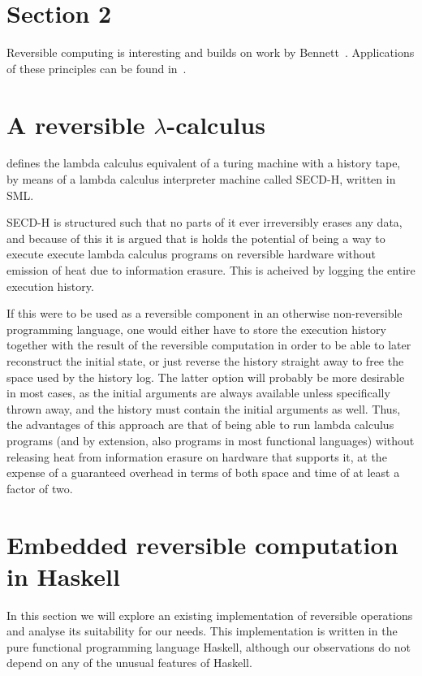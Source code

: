 \documentclass[10pt]{sigplanconf}
\begin{document}
\section{Section 2}
Reversible computing is interesting and builds on work by
Bennett~\cite{Bennett:1982}. Applications of these principles can be found
in~\cite{ThomsenAxelsen:2009:PPL,YokoyamaGlueck:2007:Janus}.


\section{A reversible $\lambda$-calculus}
\cite{huelsbergen1996logically} defines the lambda calculus equivalent of a
turing machine with a history tape, by means of a lambda calculus interpreter
machine called SECD-H, written in SML.

SECD-H is structured such that no parts of it ever irreversibly erases any
data, and because of this it is argued that is holds the potential of being a
way to execute execute lambda calculus programs on reversible hardware without
emission of heat due to information erasure.
This is acheived by logging the entire execution history.

If this were to be used as a reversible component in an otherwise
non-reversible programming language, one would either have to store the
execution history together with the result of the reversible computation in
order to be able to later reconstruct the initial state, or just reverse the
history straight away to free the space used by the history log. The latter
option will probably be more desirable in most cases, as the initial arguments
are always available unless specifically thrown away, and the history must
contain the initial arguments as well. Thus, the advantages of this approach
are that of being able to run lambda calculus programs (and by extension, also
programs in most functional languages) without releasing heat from information
erasure on hardware that supports it, at the expense of a guaranteed overhead
in terms of both space and time of at least a factor of two.

\section{Embedded reversible computation in Haskell}

In this section we will explore an existing implementation of
reversible operations and analyse its suitability for our needs.  This
implementation is written in the pure functional programming language
Haskell, although our observations do not depend on any of the unusual
features of Haskell.
\end{document}
